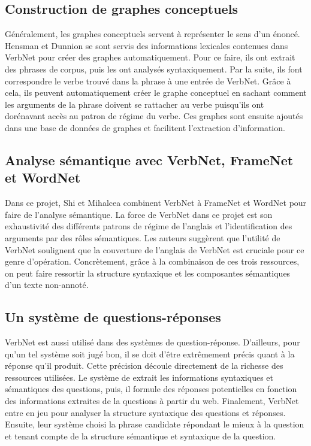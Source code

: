 \subsection{Construction de graphes conceptuels}
Généralement, les graphes conceptuels servent à représenter le sens d'un énoncé. Hensman et Dunnion se sont servis des informations lexicales contenues dans VerbNet pour créer des graphes automatiquement\citep{HensmanAutomaticallyBuildingConceptual2004}. Pour ce faire, ils ont extrait des phrases de corpus, puis les ont analysés syntaxiquement. Par la suite, ils font correspondre le verbe trouvé dans la phrase à une entrée de VerbNet. Grâce à cela, ils peuvent automatiquement créer le graphe conceptuel en sachant comment les arguments de la phrase doivent se rattacher au verbe puisqu'ils ont dorénavant accès au patron de régime du verbe. Ces graphes sont ensuite ajoutés dans une base de données de graphes et facilitent l'extraction d'information.

\subsection{Analyse sémantique avec VerbNet, FrameNet et WordNet}
\citep{Shi:2005:PPT:2132047.2132058}
Dans ce projet, Shi et Mihalcea combinent VerbNet à FrameNet et WordNet pour faire de l'analyse sémantique. La force de VerbNet dans ce projet est son exhaustivité des différents patrons de régime de l'anglais et l'identification des arguments par des rôles sémantiques. Les auteurs suggèrent que l'utilité de VerbNet soulignent que la couverture de l'anglais de VerbNet est cruciale pour ce genre d'opération. Concrètement, grâce à la combinaison de ces trois ressources, on peut faire ressortir la structure syntaxique et les composantes sémantiques d'un texte non-annoté.

\subsection{Un système de questions-réponses}
VerbNet est aussi utilisé dans des systèmes de question-réponse. D'ailleurs, pour qu'un tel système soit jugé bon, il se doit d'être extrêmement précis quant à la réponse qu'il produit. Cette précision découle directement de la richesse des ressources utilisées. Le système de \cite{DBLP:conf/nlpke/WenJH08} extrait les informations syntaxiques et sémantiques des questions, puis, il formule des réponses potentielles en fonction des informations extraites de la questions à partir du web. Finalement, VerbNet entre en jeu pour analyser la structure syntaxique des questions et réponses. Ensuite, leur système choisi la phrase candidate répondant le mieux à la question et tenant compte de la structure sémantique et syntaxique de la question.

